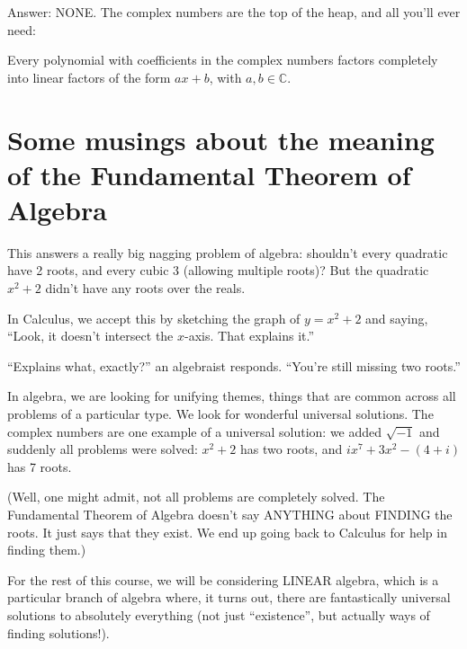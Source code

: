 Answer:  NONE.  The complex numbers are the top of the heap,
and all you'll ever need:

\begin{theorem}
Every polynomial with coefficients in the complex numbers
factors completely into linear factors of the form $ax+b$,
with $a,b \in \mathbb{C}$.
\end{theorem}

\section[Some musings about the Fundamental Theorem of Algebra]{Some musings about the meaning of the Fundamental
Theorem of Algebra}

 This answers a really big nagging problem
of algebra: shouldn't every quadratic have 2 roots, and 
every cubic 3 (allowing multiple roots)?  But the quadratic
$x^2+2$ didn't have any roots over the reals.  

In Calculus,
we accept this by sketching the graph of $y=x^2+2$ and saying,
``Look, it doesn't intersect the $x$-axis.  That explains it.''

``Explains what, exactly?'' an algebraist responds.  ``You're 
still missing two roots.''  

In algebra, we are looking for unifying themes, things that
are common across all problems of a particular type.  We look
for wonderful universal solutions.  The complex numbers are
one example of a universal solution:  we added $\sqrt{-1}$
and suddenly all problems were solved:  $x^2+2$ has two roots,
and $ix^7+3x^2-(4+i)$ has 7 roots.  

(Well, one might admit, not all problems are completely solved.
The Fundamental Theorem of Algebra doesn't say ANYTHING about
FINDING the roots.  It just says that they exist.  We end up
going back to Calculus for help in finding them.)

For the rest of this course, we will be considering LINEAR algebra,
which is a particular branch of algebra where, it turns out, there
are fantastically universal solutions to absolutely everything
(not just ``existence'', but actually ways of finding solutions!).


%
